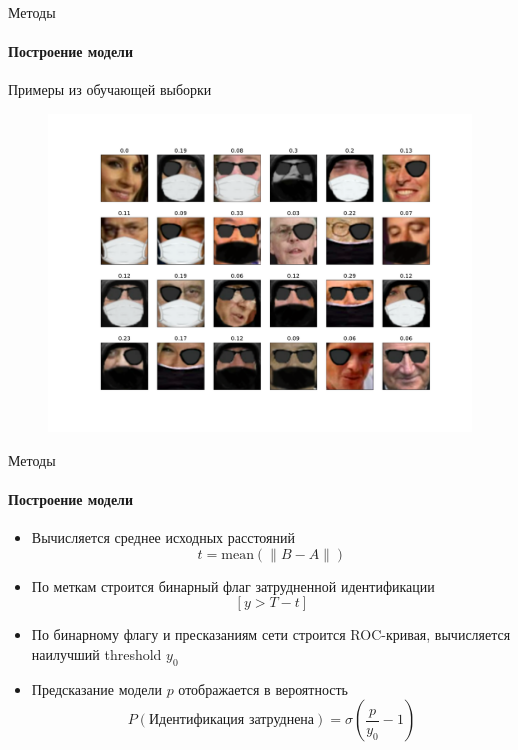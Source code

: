 \documentclass{beamer}
\begin{document}

\begin{frame}{Методы}
\framesubtitle{Построение модели}
Примеры из обучающей выборки
\begin{figure}[h!]
    \centering
    \includegraphics[scale=0.23]{traindata_demo.pdf}
\end{figure}
\end{frame}


\begin{frame}{Методы}
\framesubtitle{Построение модели}
\begin{itemize}
    \item Вычисляется среднее исходных расстояний $$t = \text{mean}(\|B - A\|)$$
    \item По меткам строится бинарный флаг затрудненной идентификации
    $$[y > T-t]$$
    \item По бинарному флагу и пресказаниям сети строится ROC-кривая, вычисляется наилучший threshold $y_0$
    \item Предсказание модели $p$ отображается в вероятность
    $$P(\text{Идентификация затруднена}) = \sigma\left(\dfrac{p}{y_0} - 1\right)$$
\end{itemize}
\end{frame}

\end{document}
